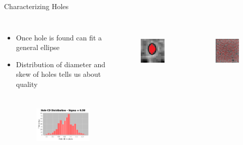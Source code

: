 \documentclass{beamer}
\begin{document}
\begin{frame}{Characterizing Holes}
	\begin{columns}
		\begin{itemize}
			\item
			Once hole is found can fit a general ellipse
			\item 
			Distribution of diameter and skew of holes tells us about quality
			
			\begin{figure}
				\includegraphics[height=85pt]{images/cd_dist.png}
			\end{figure}
		\end{itemize}
			\begin{figure}
				\includegraphics[height=75pt]{images/image49.jpg}
			\end{figure}
			\begin{figure}
				\includegraphics[height=75pt]{images/image50.png}
			\end{figure}
	\end{columns}
	
\end{frame}
\end{document}
